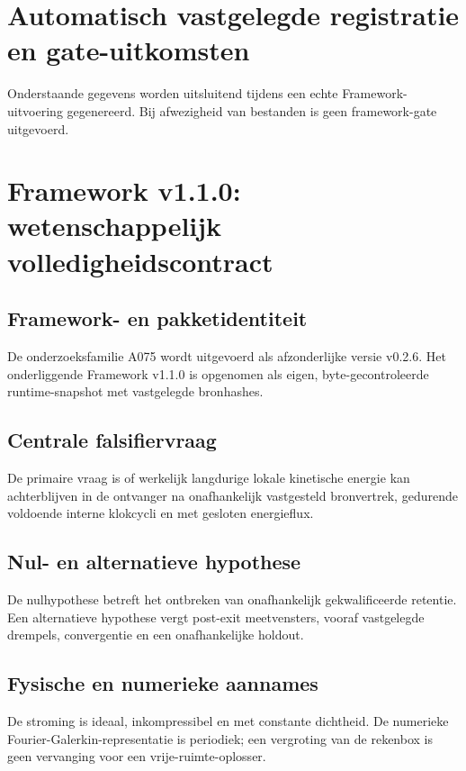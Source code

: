 \documentclass[10pt,a4paper]{article}
\begin{document}
\section{Automatisch vastgelegde registratie en gate-uitkomsten}
Onderstaande gegevens worden uitsluitend tijdens een echte Framework-uitvoering gegenereerd.
Bij afwezigheid van bestanden is geen framework-gate uitgevoerd.

\section{Framework v1.1.0: wetenschappelijk volledigheidscontract}
\subsection{Framework- en pakketidentiteit}
De onderzoeksfamilie A075 wordt uitgevoerd als afzonderlijke versie v0.2.6. Het onderliggende Framework v1.1.0 is opgenomen als eigen, byte-gecontroleerde runtime-snapshot met vastgelegde bronhashes.
\subsection{Centrale falsifiervraag}
De primaire vraag is of werkelijk langdurige lokale kinetische energie kan achterblijven in de ontvanger na onafhankelijk vastgesteld bronvertrek, gedurende voldoende interne klokcycli en met gesloten energieflux.
\subsection{Nul- en alternatieve hypothese}
De nulhypothese betreft het ontbreken van onafhankelijk gekwalificeerde retentie. Een alternatieve hypothese vergt post-exit meetvensters, vooraf vastgelegde drempels, convergentie en een onafhankelijke holdout.
\subsection{Fysische en numerieke aannames}
De stroming is ideaal, inkompressibel en met constante dichtheid. De numerieke Fourier-Galerkin-representatie is periodiek; een vergroting van de rekenbox is geen vervanging voor een vrije-ruimte-oplosser.
\end{document}
